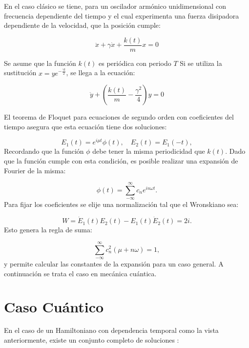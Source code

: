\documentclass[a4paper,10pt]{report}
\begin{document}
En el caso clásico \cite{HanngiFM} se tiene, para un oscilador armónico unidimensional con frecuencia dependiente del tiempo y el cual experimenta una fuerza disipadora dependiente de la velocidad, que la posición cumple:

\begin{equation}
\ddot{x}+\gamma\dot{x}+\frac{k(t)}{m}x=0
\end{equation}

Se asume que la función $k(t)$ es periódica con periodo $T$ Si se utiliza la sustitución $x=ye^{-\frac{\gamma t}{2}}$, se llega a la ecuación:

\begin{equation}
\ddot{y} +(\frac{k(t)}{m}-\frac{\gamma^2}{4})y=0
\end{equation}

El teorema de Floquet para ecuaciones de segundo orden con coeficientes del tiempo \cite{HanngiFM} asegura que esta ecuación tiene dos soluciones:

\begin{equation}
E_1(t) = e^{i\mu t}\phi(t), \quad E_2(t)=E_1(-t),
\end{equation} Recordando que la función $\phi$ debe tener la misma periodicidad que $k(t)$. Dado que la función cumple con esta condición, es posible realizar una expansión de Fourier \cite{ArfkenMM} de la misma:

\begin{equation}
\phi(t) = \sum_{-\infty}^\infty c_n e^{in\omega t}.
\end{equation} Para fijar los coeficientes se elije una normalización tal que el Wronskiano sea:

\begin{equation}
W = \dot{E}_1(t)E_2(t)-E_1(t)\dot{E}_2(t) = 2i.
\end{equation}Esto genera la regla de suma:

\begin{equation}
\sum_{-\infty}^\infty c_n^2(\mu + n\omega) = 1,
\end{equation} y permite calcular las constantes de la expansión para un caso general. A continuación se trata el caso en mecánica cuántica.

\section{Caso Cuántico}

En el caso de un Hamiltoniano con dependencia temporal como la vista anteriormente, existe un conjunto completo de soluciones \cite{BarnettSD}:
\end{document}
